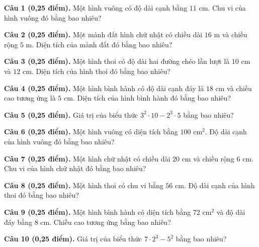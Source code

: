\documentclass[12pt,a4paper]{article}
\begin{document}
\noindent\textbf{Câu 1 (0,25 điểm).} Một hình vuông có độ dài cạnh bằng $11\text{ cm}$. Chu vi của hình vuông đó bằng bao nhiêu? \par\vspace{0.3mm}
\noindent\textbf{Câu 2 (0,25 điểm).} Một mảnh đất hình chữ nhật có chiều dài $16\text{ m}$ và chiều rộng $5\text{ m}$. Diện tích của mảnh đất đó bằng bao nhiêu? \par\vspace{0.3mm}
\noindent\textbf{Câu 3 (0,25 điểm).} Một hình thoi có độ dài hai đường chéo lần lượt là $10\text{ cm}$ và $12\text{ cm}$. Diện tích của hình thoi đó bằng bao nhiêu? \par\vspace{0.3mm}
\noindent\textbf{Câu 4 (0,25 điểm).} Một hình bình hành có độ dài cạnh đáy là $18\text{ cm}$ và chiều cao tương ứng là $5\text{ cm}$. Diện tích của hình bình hành đó bằng bao nhiêu? \par\vspace{0.3mm}
\noindent\textbf{Câu 5 (0,25 điểm).} Giá trị của biểu thức $3^2 \cdot 10 - 2^3 \cdot 5$ bằng bao nhiêu? \par\vspace{0.3mm}
\noindent\textbf{Câu 6 (0,25 điểm).} Một hình vuông có diện tích bằng $100\text{ cm}^2$. Độ dài cạnh của hình vuông đó bằng bao nhiêu? \par\vspace{0.3mm}
\noindent\textbf{Câu 7 (0,25 điểm).} Một hình chữ nhật có chiều dài $20\text{ cm}$ và chiều rộng $6\text{ cm}$. Chu vi của hình chữ nhật đó bằng bao nhiêu? \par\vspace{0.3mm}
\noindent\textbf{Câu 8 (0,25 điểm).} Một hình thoi có chu vi bằng $56\text{ cm}$. Độ dài cạnh của hình thoi đó bằng bao nhiêu? \par\vspace{0.3mm}
\noindent\textbf{Câu 9 (0,25 điểm).} Một hình bình hành có diện tích bằng $72\text{ cm}^2$ và độ dài đáy bằng $8\text{ cm}$. Chiều cao tương ứng bằng bao nhiêu? \par\vspace{0.3mm}
\noindent\textbf{Câu 10 (0,25 điểm).} Giá trị của biểu thức $7 \cdot 2^3 - 5^2$ bằng bao nhiêu? \par\vspace{0.3mm}
\vspace{0.4mm}
\end{document}
